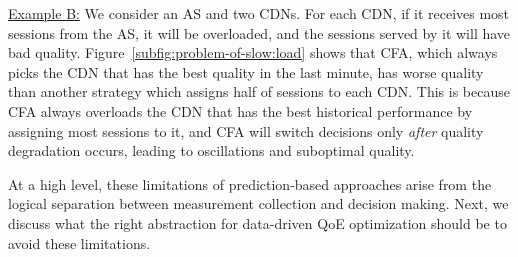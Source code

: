 \smallskip \noindent\underline{Example B:} We consider an AS and two CDNs. 
For each CDN, if it receives most sessions from the AS, it will be overloaded, and the sessions served by it will have bad quality.
Figure~\ref{subfig:problem-of-slow:load} shows that CFA, which always picks the CDN that has the best quality in the last minute, has worse quality than another
 strategy which assigns half of sessions to each CDN.  This is because 
 CFA always overloads the CDN that has the best historical performance by assigning most sessions to it, and CFA will switch decisions only {\em after} quality
degradation occurs, leading to oscillations and suboptimal quality.



At a high level,  these  limitations of prediction-based
approaches arise from the  logical
separation between measurement collection and decision making. Next, we discuss
what the right abstraction for data-driven QoE optimization should be to avoid
 these limitations.
